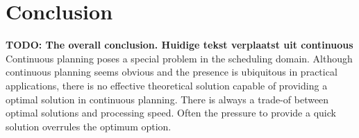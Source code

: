 \documentclass{article}
\newcommand{\TODO}[1]{{\color{red}\textbf{TODO: #1}}}
\begin{document}
%
%
%
%
%


\newpage

\section{Conclusion}
\TODO{The overall conclusion.
Huidige tekst verplaatst uit continuous}
Continuous planning poses a special problem in the scheduling domain.
Although continuous planning seems obvious and the presence is ubiquitous in practical applications, there is no effective theoretical solution capable of providing a optimal solution in continuous planning.
There is always a trade-of between optimal solutions and processing speed.
Often the pressure to provide a quick solution overrules the optimum option.

\newpage


\end{document}
